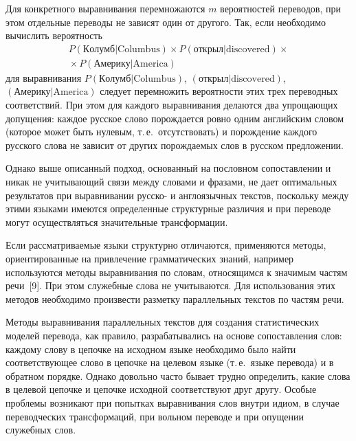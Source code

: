 \begin{multicols}{2}
     Для конкретного выравнивания перемножаются $m$ вероятностей 
переводов, при этом отдельные переводы не зависят один от другого. Так, 
если необходимо вычислить вероятность
     \begin{multline*}
     P(\mathrm{Колумб}\vert \mathrm{Columbus})\times P(\mathrm{открыл}\vert 
\mathrm{discovered})\times{}\\
{}\times P(\textrm{Америку}\vert \mathrm{America})
     \end{multline*}
для выравнивания $P(\mathrm{Колумб}\vert \mathrm{Columbus})$, 
$(\mathrm{открыл}\vert \mathrm{discovered})$, $(\textrm{Америку}\vert 
\mathrm{America})$ следует 
перемножить вероятности этих трех переводных соответствий. При этом для 
каждого выравнивания делаются два упрощающих допущения: каждое 
русское слово порождается ровно одним английским словом (которое может 
быть нулевым, т.\,е.\ отсутствовать) и порождение каждого русского слова не 
зависит от других порождаемых слов в русском предложении.
     
     Однако выше описанный подход, основанный на пословном 
сопоставлении и никак не учитывающий связи между словами и фразами, не 
дает оптимальных результатов при выравнивании рус\-ско- и 
англоязычных текстов, поскольку между этими языками имеются 
определенные структурные различия и при переводе могут осуществляться 
значительные трансформации.
     
     Если рассматриваемые языки структурно отличаются, применяются 
методы, ориентированные на привлечение грамматических знаний, например 
используются методы выравнивания по словам, относящимся к значимым 
частям речи~[9]. При этом служебные слова не учитываются. Для 
использования этих методов необходимо произвести разметку параллельных 
текстов по частям речи.
      
      Методы выравнивания параллельных текстов для создания 
статистических моделей перевода, как правило, разрабатывались на основе 
сопоставления слов: каждому слову в цепочке на исходном языке 
необходимо было найти соответствующее слово в цепочке на целевом языке 
(т.\,е.\ языке перевода) и в обратном порядке. Однако довольно часто бывает 
трудно определить, какие слова в целевой цепочке и цепочке исходной 
соответствуют друг другу. Особые проблемы возникают при попытках 
выравнивания слов внутри идиом, в случае переводческих трансформаций, 
при вольном переводе и при опущении служебных слов. 
      

\end{multicols}
